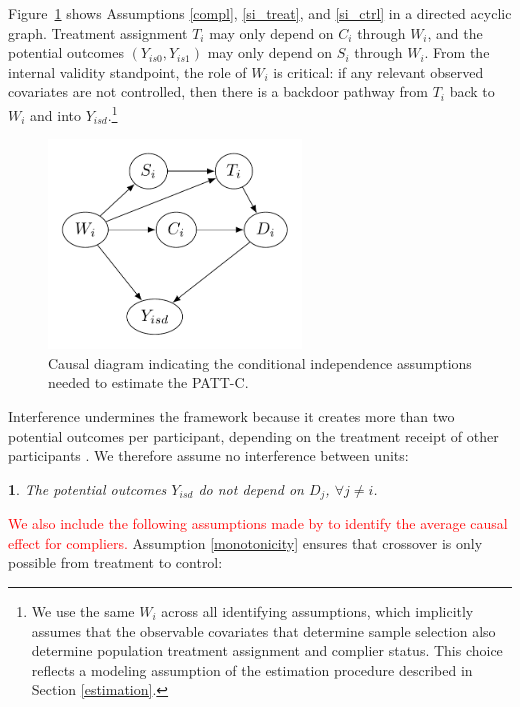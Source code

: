 \documentclass[hidelinks,12pt]{article}
\makeatletter
\newtheorem*{assumption*}{\assumptionnumber}
\providecommand{\assumptionnumber}{}
\newenvironment{assumption}[2]
 {%
  \renewcommand{\assumptionnumber}{Assumption #1}%
  \begin{assumption*}%
  \protected@edef\@currentlabel{#1}%
 }
 {%
  \end{assumption*}
 }
\makeatother
\begin{document}
Figure~\ref{fig:DAG} shows Assumptions \eqref{compl}, \eqref{si_treat}, and \eqref{si_ctrl} in a directed acyclic graph. Treatment assignment $T_i$ may only depend on $C_i$ through $W_i$, and the potential outcomes $(Y_{is0}, Y_{is1})$ may only depend on $S_i$ through $W_i$. From the internal validity standpoint, the role of $W_i$ is critical: if any relevant observed covariates are not controlled, then there is a backdoor pathway from $T_i$ back to $W_i$ and into $Y_{isd}$.\footnote{We use the same $W_i$ across all identifying assumptions, which implicitly assumes that the observable covariates that determine sample selection also determine population treatment assignment and complier status. This choice reflects a modeling assumption of the estimation procedure described in Section \ref{estimation}.}

\begin{figure}[htb]
	\begin{center}
		\includegraphics[width = 0.6\textwidth]{DAG2.png}
		\caption{Causal diagram indicating the conditional independence assumptions needed to estimate the PATT-C.\label{fig:DAG}}
	\end{center}
\end{figure}

Interference undermines the framework because it creates more than two potential outcomes per participant, depending on the treatment receipt of other participants \citep{rubin1990}. We therefore assume no interference between units: 

\vskip 0.2in
\begin{assumption}{5}{}\label{sutva}
	The potential outcomes $Y_{isd}$ do not depend on $D_j$, $\forall j\neq i$. 
\end{assumption} 

\textcolor{red}{We also include the following assumptions made by \citet{Angrist1996} to identify the average
causal effect for compliers.} Assumption \eqref{monotonicity} ensures that crossover is only possible from treatment to control:
\end{document}
